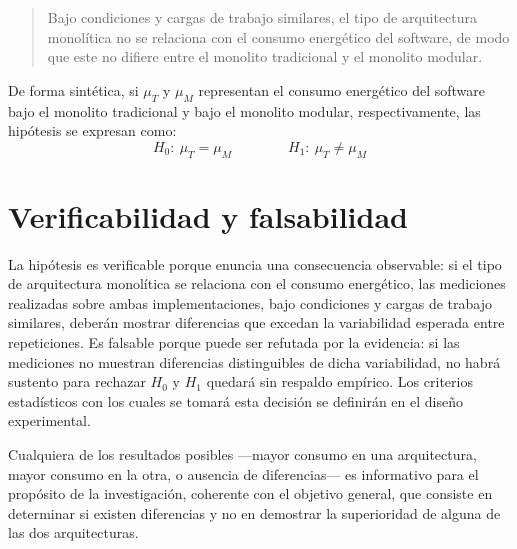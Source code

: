 \begin{quote}
Bajo condiciones y cargas de trabajo similares, el tipo de arquitectura monolítica no se relaciona con el consumo energético del software, de modo que este no difiere entre el monolito tradicional y el monolito modular.
\end{quote}

De forma sintética, si $\mu_T$ y $\mu_M$ representan el consumo energético del software bajo el monolito tradicional y bajo el monolito modular, respectivamente, las hipótesis se expresan como:
\[
H_0:\ \mu_T = \mu_M \qquad\qquad H_1:\ \mu_T \neq \mu_M
\]

\section{Verificabilidad y falsabilidad}
\label{sec:falsabilidad}

La hipótesis es verificable porque enuncia una consecuencia observable: si el tipo de arquitectura monolítica se relaciona con el consumo energético, las mediciones realizadas sobre ambas implementaciones, bajo condiciones y cargas de trabajo similares, deberán mostrar diferencias que excedan la variabilidad esperada entre repeticiones. Es falsable porque puede ser refutada por la evidencia: si las mediciones no muestran diferencias distinguibles de dicha variabilidad, no habrá sustento para rechazar $H_0$ y $H_1$ quedará sin respaldo empírico. Los criterios estadísticos con los cuales se tomará esta decisión se definirán en el diseño experimental.

Cualquiera de los resultados posibles ---mayor consumo en una arquitectura, mayor consumo en la otra, o ausencia de diferencias--- es informativo para el propósito de la investigación, coherente con el objetivo general, que consiste en determinar si existen diferencias y no en demostrar la superioridad de alguna de las dos arquitecturas.
